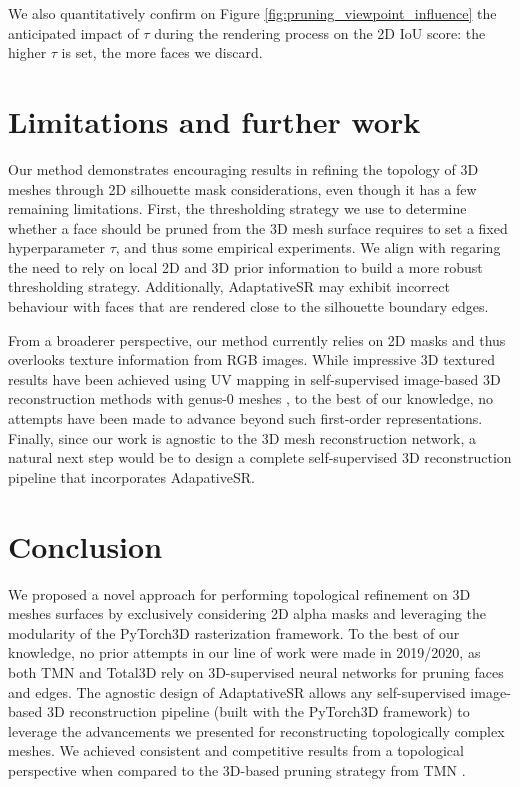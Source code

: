 We also quantitatively confirm on Figure \ref{fig:pruning_viewpoint_influence} the anticipated impact of $\tau$ during the rendering process on the 2D \ac{IoU} score: the higher $\tau$ is set, the more faces we discard. 

\section{Limitations and further work}

Our method demonstrates encouraging results in refining the topology of 3D meshes through 2D silhouette mask considerations, even though it has a few remaining limitations. First, the thresholding strategy we use to determine whether a face should be pruned from the 3D mesh surface requires to set a fixed hyperparameter $\tau$, and thus some empirical experiments. We align with \citep{nie2020total3dunderstanding} regaring the need to rely on local 2D and 3D prior information to build a more robust thresholding strategy. Additionally, AdaptativeSR may exhibit incorrect behaviour with faces that are rendered close to the silhouette boundary edges. 

From a broaderer perspective, our method currently relies on 2D masks and thus overlooks texture information from RGB images. While impressive 3D textured results have been achieved using UV mapping in self-supervised image-based 3D reconstruction methods with genus-0 meshes \citep{li2020self,pavllo2020convolutional}, to the best of our knowledge, no attempts have been made to advance beyond such first-order representations. Finally, since our work is agnostic to the 3D mesh reconstruction network, a natural next step would be to design a complete self-supervised 3D reconstruction pipeline that incorporates AdapativeSR. 

\section{Conclusion}
\label{sec:conclusion}
We proposed a novel approach for performing topological refinement on 3D meshes surfaces by exclusively considering 2D alpha masks and leveraging the modularity of the PyTorch3D rasterization framework. To the best of our knowledge, no prior attempts in our line of work were made in 2019/2020, as both TMN \citep{pan2019deep} and Total3D \citep{nie2020total3dunderstanding} rely on 3D-supervised neural networks for pruning faces and edges. The agnostic design of AdaptativeSR allows any self-supervised image-based 3D reconstruction pipeline (built with the PyTorch3D framework) to leverage the advancements we presented for reconstructing topologically complex meshes. We achieved consistent and competitive results from a topological perspective when compared to the 3D-based pruning strategy from TMN \citep{pan2019deep}. 

